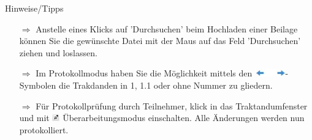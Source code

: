 \documentclass{article}
\begin{document}
\begin{beamerlikethm}{Hinweise/Tipps}
\begin{itemize}
  \item[$\Longrightarrow$] Anstelle eines Klicks auf 'Durchsuchen' beim Hochladen einer Beilage  können Sie die gewünschte Datei mit der Maus auf das Feld 'Durchsuchen' ziehen und loslassen.
  \item[$\Longrightarrow$] Im Protokollmodus haben Sie die Möglichkeit mittels den \includegraphics[height=9pt]{Icons/Pfeil-links-rechts.jpg}-Symbolen die Trakdanden in 1, 1.1 oder ohne Nummer zu gliedern.
	\item[$\Longrightarrow$] Für  Protokollprüfung durch Teilnehmer, klick in das Traktandumfenster und mit \includegraphics[height=9pt]{Icons/UeberarbModus.jpg} Überarbeitungsmodus einschalten. Alle Änderungen werden nun protokolliert.
\end{itemize}
\end{beamerlikethm}

	
	
\end{document}
